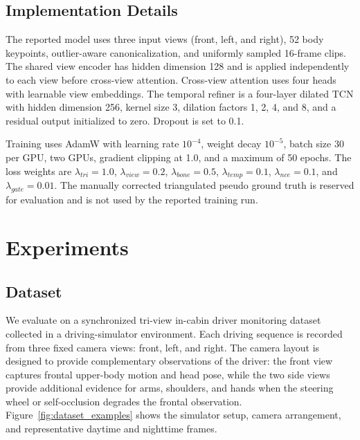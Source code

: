 \documentclass[runningheads]{llncs}
\begin{document}
\subsection{Implementation Details}
The reported model uses three input views (front, left, and right), 52 body keypoints, outlier-aware canonicalization, and uniformly sampled 16-frame clips. The shared view encoder has hidden dimension 128 and is applied independently to each view before cross-view attention. Cross-view attention uses four heads with learnable view embeddings. The temporal refiner is a four-layer dilated TCN with hidden dimension 256, kernel size 3, dilation factors 1, 2, 4, and 8, and a residual output initialized to zero. Dropout is set to 0.1.

Training uses AdamW with learning rate $10^{-4}$, weight decay $10^{-5}$, batch size 30 per GPU, two GPUs, gradient clipping at 1.0, and a maximum of 50 epochs. The loss weights are $\lambda_{tri}=1.0$, $\lambda_{view}=0.2$, $\lambda_{bone}=0.5$, $\lambda_{temp}=0.1$, $\lambda_{nce}=0.1$, and $\lambda_{gate}=0.01$. The manually corrected triangulated pseudo ground truth is reserved for evaluation and is not used by the reported training run.

\section{Experiments}
\label{sec:experiments}

\subsection{Dataset}
We evaluate on a synchronized tri-view in-cabin driver monitoring dataset collected in a driving-simulator environment. Each driving sequence is recorded from three fixed camera views: front, left, and right. The camera layout is designed to provide complementary observations of the driver: the front view captures frontal upper-body motion and head pose, while the two side views provide additional evidence for arms, shoulders, and hands when the steering wheel or self-occlusion degrades the frontal observation. Figure~\ref{fig:dataset_examples} shows the simulator setup, camera arrangement, and representative daytime and nighttime frames.
\end{document}
